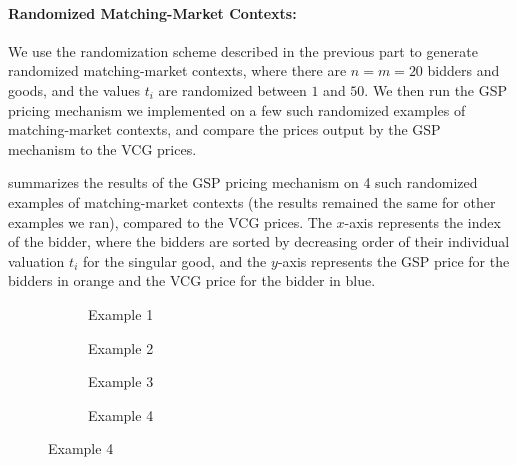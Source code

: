 \documentclass{article}
\begin{document}
\begin{enumerate}[label=(\alph*)]
    \paragraph{Randomized Matching-Market Contexts:} We use the randomization scheme described in the previous part to generate randomized matching-market contexts, where there are $n = m = 20$ bidders and goods, and the values $t_i$ are randomized between $1$ and $50$. We then run the GSP pricing mechanism we implemented on a few such randomized examples of matching-market contexts, and compare the prices output by the GSP mechanism to the VCG prices. 

     summarizes the results of the GSP pricing mechanism on 4 such randomized examples of matching-market contexts (the results remained the same for other examples we ran), compared to the VCG prices. The $x$-axis represents the index of the bidder, where the bidders are sorted by decreasing order of their individual valuation $t_i$ for the singular good, and the $y$-axis represents the GSP price for the bidders in orange and the VCG price for the bidder in blue.
    
    \begin{figure}[ht]
        \centering
        \begin{subfigure}{0.49\textwidth}
            \centering
            \resizebox{\textwidth}{!}{}
            \caption{Example 1}
        \end{subfigure}
        \hfill
        \begin{subfigure}{0.49\textwidth}
            \centering
            \resizebox{\textwidth}{!}{}
            \caption{Example 2}
        \end{subfigure}
        
        \vspace{1em} %
        
        \begin{subfigure}{0.49\textwidth}
            \centering
            \resizebox{\textwidth}{!}{}
            \caption{Example 3}
        \end{subfigure}
        \hfill
        \begin{subfigure}{0.49\textwidth}
            \centering
            \resizebox{\textwidth}{!}{}
            \caption{Example 4}
        \end{subfigure}
        

\end{figure}
\end{enumerate}
\end{document}
